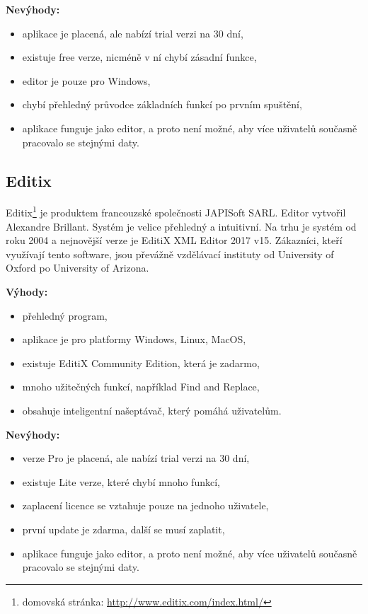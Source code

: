             \textbf{Nevýhody:}
                \begin{itemize}
                    \item aplikace je placená, ale nabízí trial verzi na 30 dní,
                    \item existuje free verze, nicméně v ní chybí zásadní funkce,
                    \item editor je pouze pro Windows,
                    \item chybí přehledný průvodce základních funkcí po prvním spuštění,
                    \item aplikace funguje jako editor, a proto není možné, aby více uživatelů současně pracovalo se stejnými daty.                \end{itemize}
                
        \subsection{Editix} 
            Editix\footnote{domovská stránka: \url{http://www.editix.com/index.html/}} je produktem francouzské společnosti JAPISoft SARL. Editor vytvořil Alexandre Brillant. Systém je velice přehledný a intuitivní. Na trhu je systém od roku 2004 a nejnovější verze je EditiX XML Editor 2017 v15. Zákazníci, kteří využívají tento software, jsou převážně vzdělávací instituty od University of Oxford po University of Arizona.
            
            \textbf{Výhody:}
                \begin{itemize}
                    \item přehledný program,
                    \item aplikace je pro platformy Windows, Linux, MacOS,
                    \item existuje EditiX Community Edition, která je zadarmo,
                    \item mnoho užitečných funkcí, například Find and Replace,
                    \item obsahuje inteligentní našeptávač, který pomáhá uživatelům.
                \end{itemize}
                
            \textbf{Nevýhody:}
                \begin{itemize}
                    \item verze Pro je placená, ale nabízí trial verzi na 30 dní,
                    \item existuje Lite verze, které chybí mnoho funkcí,
                    \item zaplacení licence se vztahuje pouze na jednoho uživatele,
                    \item první update je zdarma, další se musí zaplatit,
                    \item aplikace funguje jako editor, a proto není možné, aby více uživatelů současně pracovalo se stejnými daty.   
                \end{itemize}
                

